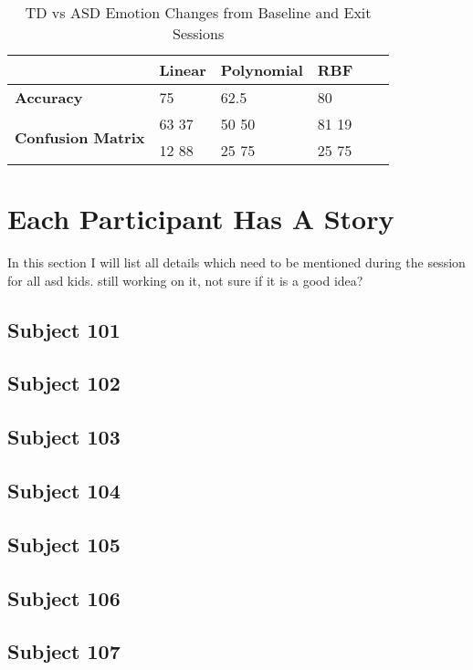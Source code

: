 \begin{table*}[tbp]
	\label{tab4}
	
	\begin{center}
		\begin{tabular}{llllll}
			& \textbf{Linear} & \textbf{Polynomial} & \textbf{RBF} \\
			\hline
			
			\textbf{Accuracy}                          & 75              & 62.5                & 80           \\
			\hline
			\multirow{2}{*}{\textbf{Confusion Matrix}} & 63  37          & 50  50              & 81  19       \\
			& 12  88          & 25  75              & 25  75       \\
			\hline
		\end{tabular}
		\caption{TD vs ASD Emotion Changes from Baseline and Exit Sessions}\label{tab4}
	\end{center}
\end{table*}

\section{Each Participant Has A Story}
In this section I will list all details which need to be mentioned during the session for all asd kids.
still working on it, not sure if it is a good idea?
\subsection{Subject 101}
\subsection{Subject 102}
\subsection{Subject 103}
\subsection{Subject 104}
\subsection{Subject 105}
\subsection{Subject 106}
\subsection{Subject 107}
